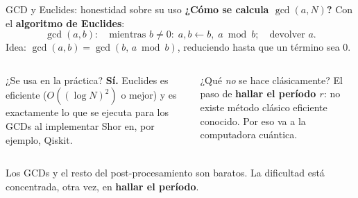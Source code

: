 \documentclass[aspectratio=169]{beamer}
\begin{document}
\begin{frame}[fragile]{GCD y Euclides: honestidad sobre su uso}
  \textbf{¿Cómo se calcula $\gcd(a,N)$?} Con el \textbf{algoritmo de Euclides}:
  \[
    \gcd(a,b):\quad
    \text{mientras } b\neq 0:\; a,b \leftarrow b,\; a\bmod b;\quad
    \text{devolver } a.
  \]
  Idea: $\gcd(a,b)=\gcd(b,\,a\bmod b)$, reduciendo hasta que un término sea 0.

  \begin{columns}[T]
    \begin{exampleblock}{¿Se usa en la práctica?}
      \textbf{Sí.} Euclides es eficiente
      ($O((\log N)^2)$ o mejor) y es exactamente lo que se ejecuta para los
      GCDs al implementar Shor en, por ejemplo, Qiskit.
    \end{exampleblock}

    \begin{alertblock}{¿Qué \emph{no} se hace clásicamente?}
      El paso de \textbf{hallar el período $r$}: no existe método clásico
      eficiente conocido. Por eso va a la computadora cuántica.
    \end{alertblock}
  \end{columns}

  \vspace{0.4em}
  \begin{block}{}
    \small Los GCDs y el resto del post-procesamiento son baratos.
    La dificultad está concentrada, otra vez, en \textbf{hallar el período}.
  \end{block}

\end{frame}

\end{document}
